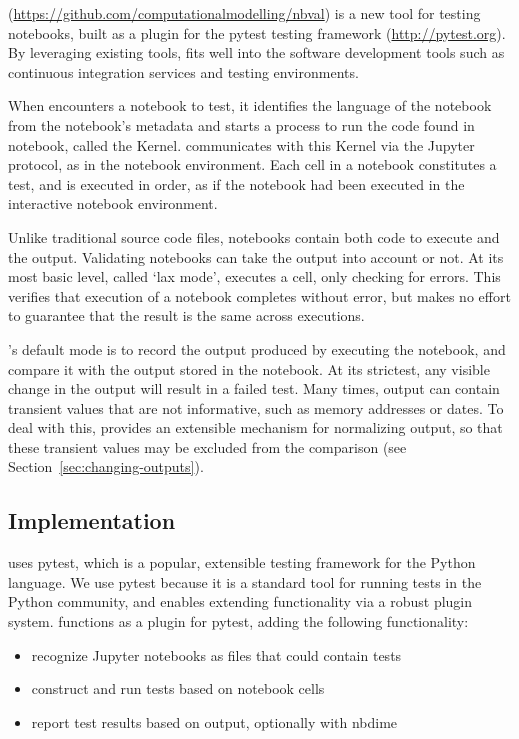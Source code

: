 \documentclass{deliverablereport}
\begin{document}
\nbval (\url{https://github.com/computationalmodelling/nbval}) is a
new tool for testing notebooks, built as a plugin for the pytest
testing framework (\url{http://pytest.org}).  By leveraging existing
tools, \nbval fits well into the software development tools such as
continuous integration services and testing environments.

When \nbval encounters a notebook to test, it identifies the language
of the notebook from the notebook's metadata and starts a process to
run the code found in notebook, called the Kernel.  \nbval
communicates with this Kernel via the Jupyter protocol, as in the
notebook environment.  Each cell in a notebook constitutes a test, and
is executed in order, as if the notebook had been executed in the
interactive notebook environment.

Unlike traditional source code files, notebooks contain both code to
execute and the output.  Validating notebooks can take the output into
account or not.  At its most basic level, called `lax mode', \nbval
executes a cell, only checking for errors.  This verifies that
execution of a notebook completes without error, but makes no effort
to guarantee that the result is the same across executions.

\nbval's default mode is to record the output produced by executing
the notebook, and compare it with the output stored in the notebook.
At its strictest, any visible change in the output will result in a
failed test.  Many times, output can contain transient values that are
not informative, such as memory addresses or dates.  To deal with
this, \nbval provides an extensible mechanism for normalizing output,
so that these transient values may be excluded from the comparison
(see Section~\ref{sec:changing-outputs}).

\subsection{Implementation}

\nbval uses pytest, which is a popular, extensible testing framework for the Python language.
We use pytest because it is a standard tool for running tests in the Python community,
and enables extending functionality via a robust plugin system.
\nbval functions as a plugin for pytest, adding the following functionality:

\begin{itemize}
\item recognize Jupyter notebooks as files that could contain tests
\item construct and run tests based on notebook cells
\item report test results based on output, optionally with nbdime
\end{itemize}
\end{document}
